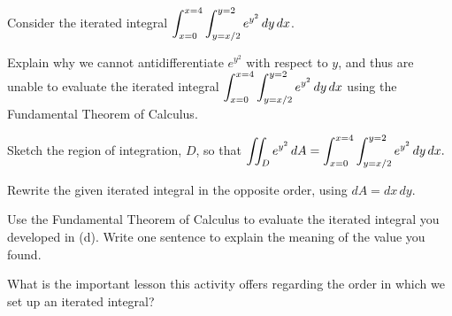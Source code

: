 \begin{activity} \label{A:11.3.3} Consider the iterated integral $\displaystyle \int_{x=0}^{x=4} \int_{y=x/2}^{y=2} e^{y^2} \, dy \, dx$.

\ba
  \item Explain why we cannot antidifferentiate $e^{y^2}$ with respect to $y$, and thus are unable to evaluate the iterated integral $\displaystyle  \int_{x=0}^{x=4} \int_{y=x/2}^{y=2} e^{y^2} \, dy \, dx$ using the Fundamental Theorem of Calculus. 
  \item Sketch the region of integration, $D$, so that $\displaystyle \iint_D e^{y^2} \, dA = \int_{x=0}^{x=4} \int_{y=x/2}^{y=2} e^{y^2} \, dy \, dx.$
  \item Rewrite the given iterated integral in the opposite order, using $dA = dx \, dy$.
  \item Use the Fundamental Theorem of Calculus to evaluate the iterated integral you developed in (d).  Write one sentence to explain the meaning of the value you found.
  \item What is the important lesson this activity offers regarding the order in which we set up an iterated integral?
\ea

\end{activity}
\begin{smallhint}

\end{smallhint}
\begin{bighint}

\end{bighint}
